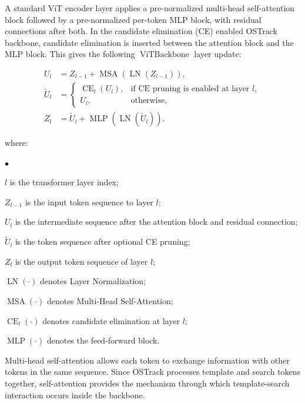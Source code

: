 \documentclass[bachelorthesis]{fer}
\numberwithin{equation}{chapter}
\newcommand{\FormulaNotationWith}[2]{%
    \vspace{-0.6em}
    \noindent\hspace*{1.2em}%
    \begin{minipage}{0.90\textwidth}
        \footnotesize
        #1
        \vspace{0.2em}
        \begin{list}{\(\bullet\)}{
            \setlength{\leftmargin}{1.4em}
            \setlength{\labelwidth}{0.8em}
            \setlength{\labelsep}{0.5em}
            \setlength{\itemsep}{0.05em}
            \setlength{\parsep}{0pt}
            \setlength{\topsep}{0.25em}
            \setlength{\partopsep}{0pt}
        }
            #2
        \end{list}
    \end{minipage}
    \par
    \vspace{0.8em}

}
\newcommand{\FormulaNotation}[1]{\FormulaNotationWith{where:}{#1}}
\begin{document}
    A standard ViT encoder layer applies a pre-normalized multi-head self-attention block followed by a pre-normalized per-token MLP
    block, with residual connections after both. In the candidate elimination (CE) enabled OSTrack backbone, candidate elimination is inserted
    between the attention block and the MLP block. This gives the following \(\operatorname{ViTBackbone}\) layer update:

    \begin{align}
        U_l &=
        Z_{l-1}
        +
        \operatorname{MSA}\left(\operatorname{LN}(Z_{l-1})\right),
        \\[0.5em]
        \tilde{U}_l &=
        \begin{cases}
            \operatorname{CE}_l(U_l), & \text{if CE pruning is enabled at layer } l, \\
            U_l, & \text{otherwise},
        \end{cases}
        \\[0.5em]
        Z_l &=
        \tilde{U}_l
        +
        \operatorname{MLP}\left(\operatorname{LN}(\tilde{U}_l)\right).
    \end{align}
    \FormulaNotation{
        \item \(l\) is the transformer layer index;
        \item \(Z_{l-1}\) is the input token sequence to layer \(l\);
        \item \(U_l\) is the intermediate sequence after the attention block and residual connection;
        \item \(\tilde{U}_l\) is the token sequence after optional CE pruning;
        \item \(Z_l\) is the output token sequence of layer \(l\);
        \item \(\operatorname{LN}(\cdot)\) denotes Layer Normalization;
        \item \(\operatorname{MSA}(\cdot)\) denotes Multi-Head Self-Attention;
        \item \(\operatorname{CE}_l(\cdot)\) denotes candidate elimination at layer \(l\);
        \item \(\operatorname{MLP}(\cdot)\) denotes the feed-forward block.
    }

    Multi-head self-attention allows each token to exchange information with other tokens in the same sequence. Since OSTrack
    processes template and search tokens together, self-attention provides the mechanism
    through which template-search interaction occurs inside the backbone.
\end{document}
